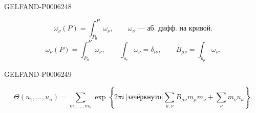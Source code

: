 \begin{GelfandAdjacentEvidence}{GELFAND-P000624}{8}

\[
\omega_\nu(P)=\int_{P_0}^{P}\omega_\nu,\qquad
\omega_\nu\text{ --- аб. дифф. на кривой}.
\]
\[
\omega_\nu(P)=\int_{P_0}^{P}\omega_\nu,\qquad
\int_{a_i}\omega_\nu=\delta_{i\nu},\qquad
B_{\mu\nu}=\int_{b_\mu}\omega_\nu.
\]
\end{GelfandAdjacentEvidence}
\begin{GelfandAdjacentEvidence}{GELFAND-P000624}{9}

\[
\Theta(u_1,\ldots,u_n)=\sum_{m_1,\ldots,m_n}
\exp\left\{2\pi i\,\text{[зачёркнуто]}\!
\sum_{\mu,\nu} B_{\mu\nu}m_\mu m_\nu+\sum_\nu m_\nu u_\nu\right\}.
\]
\end{GelfandAdjacentEvidence}

\begin{center}\textemdash\,\textperiodcentered\,\textemdash\end{center}


